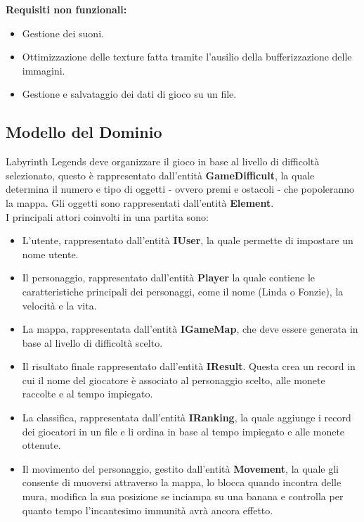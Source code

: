 \documentclass[12pt, letterpaper]{article}
\begin{document}
        \textbf{Requisiti non funzionali:}
            \begin{itemize}
                \item Gestione dei suoni.
                \item Ottimizzazione delle texture fatta tramite l'ausilio della bufferizzazione delle immagini.
                \item Gestione e salvataggio dei dati di gioco su un file.
            \end{itemize}
    \subsection{Modello del Dominio}
        Labyrinth Legends deve organizzare il gioco in base al livello di difficoltà selezionato, questo è rappresentato dall'entità \textbf{GameDifficult}, la quale determina il numero e tipo di oggetti  -  ovvero premi e ostacoli - che popoleranno la mappa. Gli oggetti sono rappresentati dall'entità \textbf{Element}.\\
        I principali attori coinvolti in una partita sono:
        \begin{itemize}
            \item  L'utente, rappresentato dall’entità \textbf{IUser}, la quale permette di impostare un nome utente.
            \item Il personaggio, rappresentato dall'entità \textbf{Player} la quale contiene le caratteristiche principali dei personaggi, come il nome (Linda o Fonzie), la velocità e la vita.
            \item La mappa, rappresentata dall’entità \textbf{IGameMap}, che deve essere generata in base al livello di difficoltà scelto. 
            \item  Il risultato finale rappresentato dall'entità \textbf{IResult}. Questa crea un record in cui il nome del giocatore è associato al personaggio scelto, alle monete raccolte e al tempo impiegato.
            \item La classifica, rappresentata dall'entità \textbf{IRanking}, la quale aggiunge i record dei giocatori in un file e li ordina in base al tempo impiegato e alle monete ottenute.
            \item Il movimento del personaggio, gestito dall'entità \textbf{Movement}, la quale gli consente di muoversi attraverso la mappa, lo blocca quando incontra delle mura, modifica la sua posizione se inciampa su una banana e controlla per quanto tempo l'incantesimo immunità avrà ancora effetto.
        \end{itemize}
\end{document}
